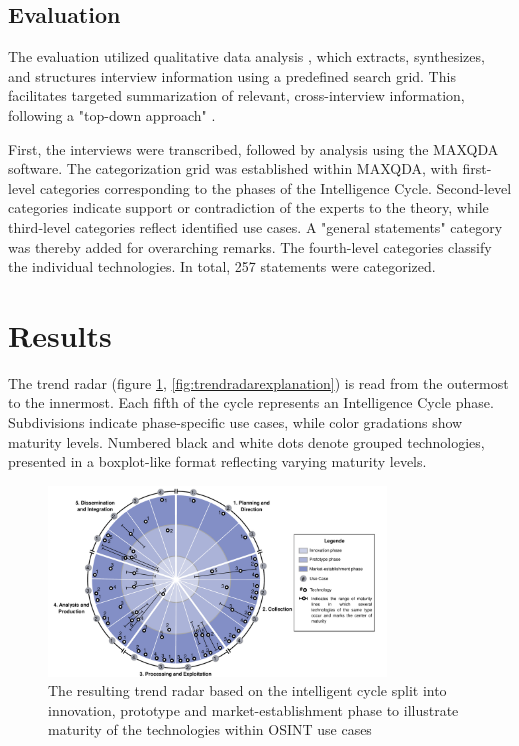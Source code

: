 \documentclass[10pt]{article}
\begin{document}
\subsection{Evaluation} \label{sec:eval}

The evaluation utilized qualitative data analysis \cite{Glaser.2009}, which extracts, synthesizes, and structures interview information using a predefined search grid. This facilitates targeted summarization of relevant, cross-interview information, following a "top-down approach" \cite{Bogner.2014, Glaser.2009}.

First, the interviews were transcribed, followed by analysis using the MAXQDA software. The categorization grid was established within MAXQDA, with first-level categories corresponding to the phases of the Intelligence Cycle. Second-level categories indicate support or contradiction of the experts to the theory, while third-level categories reflect identified use cases. A "general statements" category was thereby added for overarching remarks. The fourth-level categories classify the individual technologies. In total, 257 statements were categorized.

\section{Results} \label{sec:results}

The trend radar (figure \ref{fig:trendradar}, \ref{fig:trendradarexplanation}) is read from the outermost to the innermost.
Each fifth of the cycle represents an Intelligence Cycle phase. Subdivisions indicate
phase-specific use cases, while color gradations show maturity levels. Numbered black
and white dots denote grouped technologies, presented in a boxplot-like format reflecting
varying maturity levels.

\begin{figure}[thb]
    \centering
    \includegraphics[width=0.8\textwidth]{PDF/images/crop_Trendradar}
    \caption{The resulting trend radar based on the intelligent cycle split into innovation, prototype and market-establishment phase to illustrate maturity of the technologies within OSINT use cases}
    \label{fig:trendradar}
\end{figure}
\end{document}
